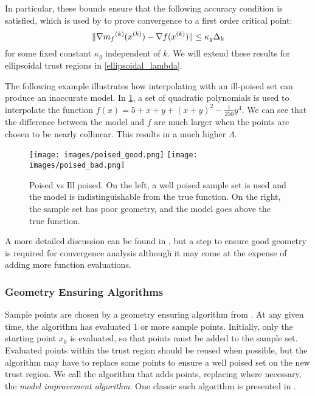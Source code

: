 In particular, these bounds ensure that the following accuracy condition is satisfied, which is used by \cite{Conejo:2013:GCT:2620806.2621814} to prove convergence to a first order critical point: 
\begin{equation}
\label{accuracy}
\|\nabla {{m}_f}^{(k)}({x^{(k)}}) - \nabla f({x^{(k)}}) \| \le \kappa_g \Delta_k
\end{equation}
 for some fixed constant $\kappa_g$ independent of $k$.
We will extend these results for ellipsoidal trust regions in \cref{ellipsoidal_lambda}.
 

The following example illustrates how interpolating with an ill-poised set can produce an inaccurate model.
In \cref{pvip}, a set of quadratic polynomials is used to interpolate the function $f(x) = 5 + x + y + (x + y) ^ 2 - \frac 1 {250} y ^ 4$.
We can see that the difference between the model and $f$ are much larger when the points are chosen to be nearly collinear.
This results in a much higher $\Lambda$.

\begin{figure}[h]
    \centering
    \texttt{[image: images/poised\_good.png]}
    \texttt{[image: images/poised\_bad.png]}
    \caption{
		Poised vs Ill poised.
		On the left, a well poised sample set is used and the model is indistinguishable from the true function.
		On the right, the sample set has poor geometry, and the model goes above the true function.
	}
    \label{pvip}
\end{figure}


A more detailed discussion can be found in \cite{doi:10.1080/10556780802409296}, but a step to ensure good geometry is required for convergence analysis although it may come at the expense of adding more function evaluations.

\subsubsection{Geometry Ensuring Algorithms}

Sample points are chosen by a geometry ensuring algorithm from \cite{DUMMY:intro_book}.
At any given time, the algorithm has evaluated 1 or more sample points.
Initially, only the starting point $x_0$ is evaluated, so that points must be added to the sample set.
Evaluated points within the trust region should be reused when possible, but the algorithm may have to replace some points to ensure a well poised set on the new trust region.
We call the algorithm that adds points, replacing where necessary, the \emph{model improvement algorithm}.
One classic such algorithm is presented in \cite{DUMMY:intro_book}.

